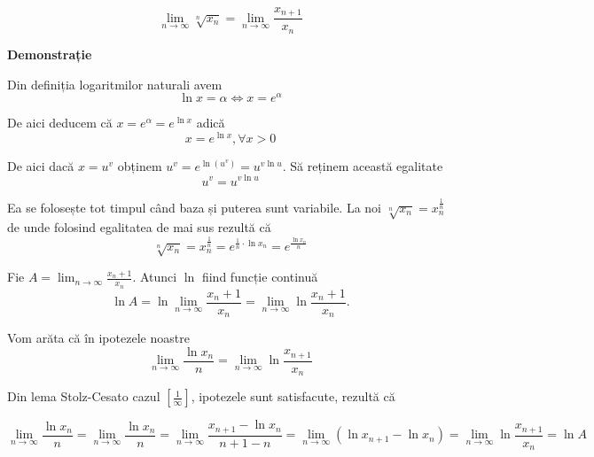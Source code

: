 \documentclass[a4paper,12pt,oneside]{report}
\begin{document}
\begin{displaymath}
  \lim_{n \to \infty } \sqrt[n]{x_{n}} = \lim_{n \to \infty }\frac{x_{n+1}}{x_{n}}
\end{displaymath}



\textbf{Demonstrație} 

Din definiția logaritmilor naturali avem 
\begin{displaymath}
  \ln x = \alpha  \Leftrightarrow x = e^{\alpha }
\end{displaymath}

De aici deducem că \(x = e^{\alpha } = e^{\ln x}\) adică 
\begin{displaymath}
  x = e^{\ln x}, \forall x> 0
\end{displaymath}

De aici dacă \(x=u^{v}\) obținem \(u^{v} = e^{\ln\left ( u^{v} \right )} = u^{v\ln u}\). 
Să reținem această egalitate
\begin{displaymath}
  u^{v} = u^{v\ln u}
\end{displaymath}

Ea se folosește tot timpul când baza și puterea sunt variabile. La noi  \(\sqrt[n]{x_{n}}= x_{n}^{\frac{1}{n}} \)de unde folosind egalitatea de mai sus rezultă că 
\begin{displaymath}
  \sqrt[n]{x_{n}}= x_{n}^{\frac{1}{n}} = e^{\frac{1}{n}\cdot \ln x_{n}} = e^{\frac{\ln x_{n}}{n}}
\end{displaymath}


Fie \(A = \lim_{n \to \infty }\frac{x_{n}+1}{x_{n}}\). Atunci \(\ln\) fiind funcție continuă 
\begin{displaymath}
  \ln A = \ln \lim_{n \to \infty }\frac{x_{n}+1}{x_{n}} = \lim_{n \to \infty }\ln \frac{x_{n}+1}{x_{n}}.
\end{displaymath}


Vom arăta că în ipotezele noastre 
\begin{displaymath}
  \lim_{n \to \infty }\frac{\ln x_{n}}{n} = \lim_{n \to \infty }\ln\frac{x_{n+1}}{x_{n}}
\end{displaymath}

 Din lema Stolz-Cesato cazul \(\left [ \frac{1}{\infty } \right ]\), ipotezele sunt satisfacute, rezultă că 

\begin{displaymath}
  \lim_{n \to \infty }\frac{\ln x_{n}}{n} 
= \lim_{n \to \infty }\frac{\ln x_{n}}{n}  
= \lim_{n \to \infty}\frac{x_{n+1}-\ln x_{n}}{n+1-n} 
= \lim_{n \to \infty}\left ( \ln x_{n+1} - \ln x_{n} \right ) 
= \lim_{n \to \infty }\ln \frac{x_{n+1}}{x_{n}} 
= \ln A
\end{displaymath}
\end{document}
